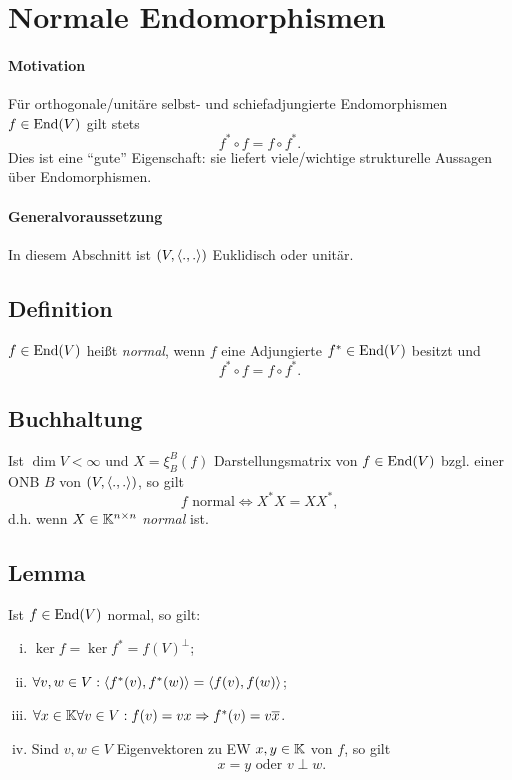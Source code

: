 \section{Normale Endomorphismen}
\paragraph{Motivation}
	Für orthogonale/unitäre selbst- und schiefadjungierte Endomorphismen $ f\in \operatorname{End}(V) $ gilt stets
		\[ f^*\circ f = f\circ f^*. \]
	Dies ist eine "`gute"' Eigenschaft: sie liefert viele/wichtige strukturelle Aussagen über Endomorphismen.
\paragraph{Generalvoraussetzung}
	In diesem Abschnitt ist $ (V,\langle .,. \rangle) $ Euklidisch oder unitär.

\subsection{Definition}
\begin{Definition}[normal]
	$ f\in \operatorname{End}(V) $ heißt \emph{normal}, wenn $ f $ eine Adjungierte $ f^*\in \operatorname{End}(V) $ besitzt und 
		\[ f^*\circ f = f\circ f^*. \]
\end{Definition}
\subsection{Buchhaltung}
	Ist $ \dim V < \infty $ und $ X=\xi_B^B(f) $ Darstellungsmatrix von $ f\in \operatorname{End}(V) $ bzgl. einer ONB $ B $ von $ (V,\langle .,. \rangle) $, so gilt
		\[ f \text{ normal}\Leftrightarrow X^*X=XX^*, \]
	d.h. wenn $ X\in \mathbb{K}^{n\times n} $ \emph{normal} ist.
	
\subsection{Lemma}
\begin{Lemma}[]
	Ist $ f\in \operatorname{End}(V) $ normal, so gilt:
		\begin{enumerate}[(i)]
			\item $ \ker f = \ker f^* = f(V)^\perp $;
			\item $ \forall v,w\in V: \langle f^*(v),f^*(w) \rangle=\langle f(v),f(w) \rangle $;
			\item $ \forall x\in \mathbb{K}\forall v\in V: f(v) = vx \Rightarrow f^*(v) = v\overline{x} $.
			\item Sind $ v,w\in V $ Eigenvektoren zu EW $ x,y\in \mathbb{K} $ von $ f $, so gilt
				\[ x = y \text{ oder } v\perp w. \]
		\end{enumerate}
\end{Lemma}
